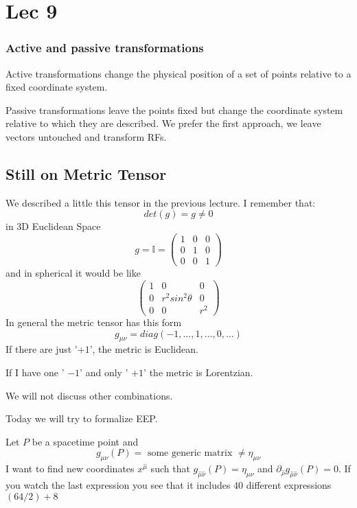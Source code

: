 \section{Lec 9}
\subsubsection{Active and passive transformations}
Active transformations change the physical position of a set of points relative to a fixed coordinate system. \par
Passive transformations leave the points fixed but change the coordinate system relative to which they are described.
We prefer the first approach, we leave vectors untouched and transform RFs.

\subsection{Still on Metric Tensor}
We described a little this tensor in the previous lecture. I remember that:
\[
det\left( g \right) = g \neq 0
\]
in 3D Euclidean Space
\[
	g = \mathbb{I} = \begin{pmatrix}
	1 & 0 & 0 \\
	0 & 1 & 0 \\
	0 & 0 & 1
	\end{pmatrix} 		
\]
and in spherical it would be like
\[
\begin{pmatrix}
1 & 0 & 0 \\
0 & r^{2}sin^{2}\theta  & 0 \\
0 & 0 & r^{2}
\end{pmatrix} 
\]
In general the metric tensor has this form
\[
g_{\mu \nu } = diag\left( -1, \ldots, 1, \ldots , 0, \ldots   \right)
\]
If there are just '$+1$', the metric is Euclidean.\par
If I have one ' $-1$' and only ' $+1$' the metric is Lorentzian.\par
We will not discuss other combinations.

Today we will try to formalize EEP.\par

Let $P$ be a spacetime point and 
\[
g_{\mu \nu }\left( P \right)= \text{ some generic matrix } \neq \eta_{\mu \nu }
\]
I want to find new coordinates $x^{\hat{\mu }}$ such that $g_{\hat{\mu }\hat{\nu }}\left( P \right)=\eta_{\mu \nu }$ and $\partial_{\hat{\rho }}g_{\hat{\mu }\hat{\nu }}\left( P \right)=0$.
If you watch the last expression you see that it includes 40 different expressions $\left( 64/2 \right)+8$

